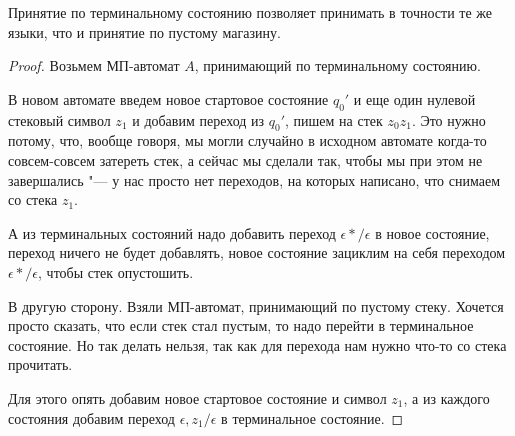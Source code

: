 \begin{assertion}
Принятие по терминальному состоянию позволяет принимать в точности те же языки, что и принятие по пустому магазину.
\end{assertion}
\begin{proof}
Возьмем МП-автомат $A$, принимающий по терминальному состоянию.

В новом автомате введем новое стартовое состояние $q_0'$ и еще один нулевой стековый символ $z_1$ и добавим переход из $q_0'$, пишем на стек $z_0z_1$. 
Это нужно потому, что, вообще говоря, мы могли случайно в исходном автомате когда-то совсем-совсем затереть стек, а сейчас мы сделали так, чтобы мы при этом не завершались "--- у нас просто нет 
переходов, на которых написано, что снимаем со стека $z_1$.

А из терминальных состояний надо добавить переход $\epsilon */\epsilon$ в новое состояние, переход ничего не будет добавлять, новое состояние зациклим на себя переходом $\epsilon */\epsilon$, чтобы стек опустошить.


В другую сторону.
Взяли МП-автомат, принимающий по пустому стеку.
Хочется просто сказать, что если стек стал пустым, то надо перейти в терминальное состояние. 
Но так делать нельзя, так как для перехода нам нужно что-то со стека прочитать.

Для этого опять добавим новое стартовое состояние и символ $z_1$, а из каждого состояния добавим переход $\epsilon,z_1/\epsilon$ в терминальное состояние.
\end{proof}

